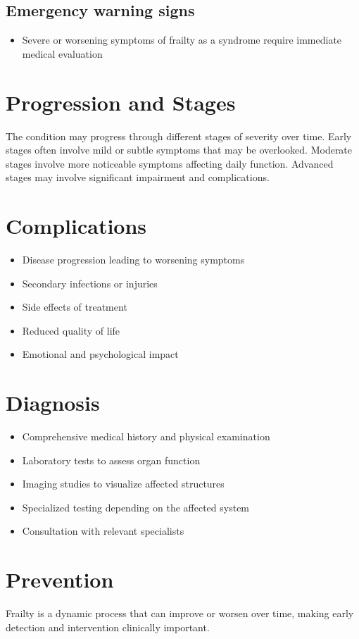 \subsection{Emergency warning signs}
\begin{itemize}[noitemsep]
  \item Severe or worsening symptoms of frailty as a syndrome require immediate medical evaluation
\end{itemize}
\section{Progression and Stages}
The condition may progress through different stages of severity over time. Early stages often involve mild or subtle symptoms that may be overlooked. Moderate stages involve more noticeable symptoms affecting daily function. Advanced stages may involve significant impairment and complications.
\section{Complications}
\begin{itemize}[noitemsep]
  \item Disease progression leading to worsening symptoms
  \item Secondary infections or injuries
  \item Side effects of treatment
  \item Reduced quality of life
  \item Emotional and psychological impact
\end{itemize}
\section{Diagnosis}
\begin{itemize}[noitemsep]
  \item Comprehensive medical history and physical examination
  \item Laboratory tests to assess organ function
  \item Imaging studies to visualize affected structures
  \item Specialized testing depending on the affected system
  \item Consultation with relevant specialists
\end{itemize}
\section{Prevention}
Frailty is a dynamic process that can improve or worsen over time, making early detection and intervention clinically important.

